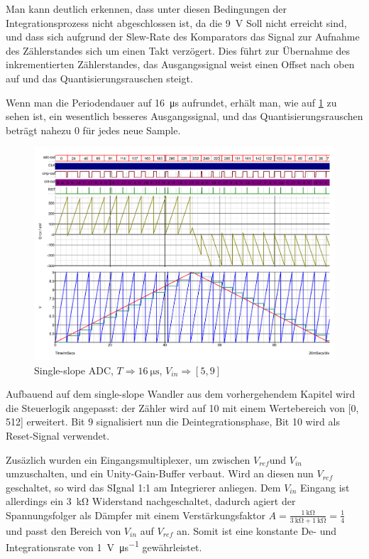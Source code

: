\documentclass[
	ngerman,
	parskip=half,
	headsepline,
	twocolumn,
	DIV=calc,
	listof=leveldown,
	]{scrartcl}
\begin{document}
		Man kann deutlich erkennen, dass unter diesen Bedingungen der Integrationsprozess nicht abgeschlossen ist, da die \SI{9}{\volt} Soll nicht erreicht sind, und dass sich aufgrund der Slew-Rate des Komparators das Signal zur Aufnahme des Zählerstandes sich um einen Takt verzögert. Dies führt zur Übernahme des inkrementierten Zählerstandes, das Ausgangssignal weist einen Offset nach oben auf und das Quantisierungsrauschen steigt.
		
		Wenn man die Periodendauer auf \SI{16}{\micro\second} aufrundet, erhält man, wie auf \cref{fig:single-slope-ideal} zu sehen ist, ein wesentlich besseres Ausgangssignal, und das Quantisierungsrauschen beträgt nahezu 0 für jedes neue Sample. 
		
		\begin{figure}[h!]
			\centering
			\includegraphics[width=\linewidth]{ideal_single_slope}
			\caption[Single-slope ADC (\SI{244.14}{\hertz})]{Single-slope ADC, $T \Rightarrow \SI{16}{\micro\second}$, $V_{in} \Rightarrow [5,  9]$}
			\label{fig:single-slope-ideal}
		\end{figure}
		
		
		\label{sec:dual-slope-adc}
		
		Aufbauend auf dem single-slope Wandler aus dem vorhergehendem Kapitel wird die Steuerlogik angepasst: der Zähler wird auf \SI{10}{\bit} mit einem Wertebereich von [0, 512] erweitert. Bit 9 signalisiert nun die Deintegrationsphase, Bit 10 wird als Reset-Signal verwendet.
				
		Zusäzlich wurden ein Eingangsmultiplexer, um zwischen $V_{ref} $und $V_{in} $ umzuschalten, und ein Unity-Gain-Buffer verbaut.
		Wird an diesen nun $V_{ref} $ geschaltet, so wird das SIgnal 1:1 am Integrierer anliegen. Dem $V_{in}$ Eingang ist allerdings ein \SI{3}{\kilo\ohm} Widerstand nachgeschaltet, dadurch agiert der  Spannungsfolger als Dämpfer mit einem Verstärkungsfaktor $ A = \frac{\SI{1}{\kilo\ohm}}{\SI{3}{\kilo\ohm} + \SI{1}{\kilo\ohm}} = \frac{1}{4}$ und passt den Bereich von $V_{in} $ auf $V_{ref} $ an. Somit ist eine konstante De- und Integrationsrate von \SI{1}{\volt\per\micro\second} gewährleistet.
		
\end{document}
